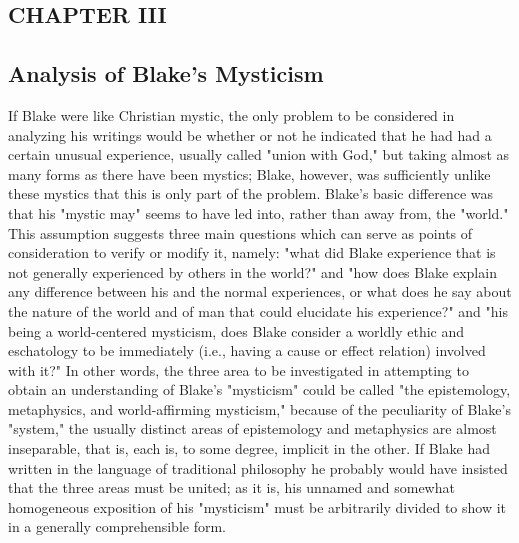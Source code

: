 \newpage

\begin{center}
	\section[Chapter III: Analysis of Blake's Mysticism]{CHAPTER III}
	\subsection*{Analysis of Blake's Mysticism}
\end{center}

{}

If Blake were like Christian mystic, the only problem to be considered in analyzing his
writings would be whether or not he indicated that he had had a certain unusual experience,
usually called "union with God," but taking almost as many forms as there have been mystics; Blake, however,
was sufficiently unlike these mystics that this is only part of the problem. Blake's basic difference was that
his "mystic may" seems to have led into, rather than away from, the "world." This assumption
suggests three main questions which can serve as points of consideration to verify
or modify it, namely: "what did Blake experience that is not generally experienced by others in the world?"
and "how does Blake explain any difference between his and the normal experiences, or what does he say about the
nature of the world and of man that could elucidate his experience?" and "his being a world-centered mysticism,
does Blake consider a worldly ethic and eschatology to be immediately (i.e., having a cause or effect relation) involved
with it?" In other words, the three area to be investigated in attempting to obtain an understanding of
Blake's "mysticism" could be called "the epistemology, metaphysics, and world-affirming
mysticism," because of the peculiarity of Blake's "system," the usually distinct
areas of epistemology and metaphysics are almost inseparable, that is, each is, to some degree,
implicit in the other. If Blake had written in the language of traditional philosophy
he probably would have insisted that the three areas must be united; as it is, his unnamed and somewhat
homogeneous exposition of his "mysticism" must be arbitrarily divided to show it in a generally comprehensible form.\par
\vspace*{0.5\baselineskip}
